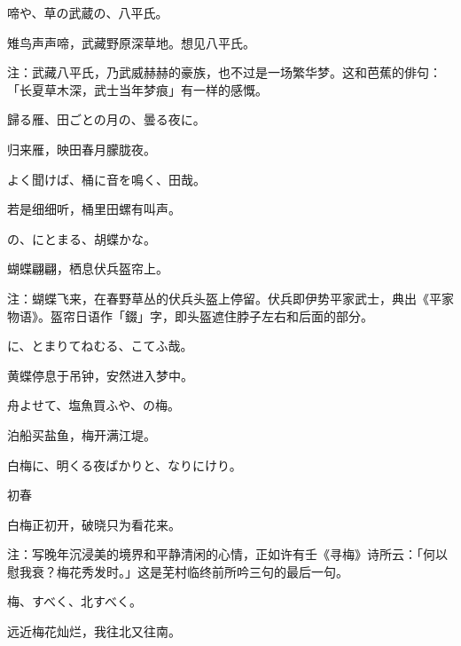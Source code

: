 \begin{haiku}
    {\FH {}啼や、草の武蔵の、八平氏。}

    {\FK 雉鸟声声啼，武藏野原深草地。想见八平氏。}

    {\FT 注：武藏八平氏，乃武威赫赫的豪族，也不过是一场繁华梦。这和芭蕉的俳句：「长夏草木深，武士当年梦痕」有一样的感慨。}
\end{haiku}

\begin{haiku}
    {\FH 歸る雁、田ごとの月の、曇る夜に。}

    {\FK 归来雁，映田春月朦胧夜。}
\end{haiku}

\begin{haiku}
    {\FH よく聞けば、桶に音を鳴く、田哉。}

    {\FK 若是细细听，桶里田螺有叫声。}
\end{haiku}

\begin{haiku}
    {\FH {}の、にとまる、胡蝶かな。}

    {\FK 蝴蝶翩翩，栖息伏兵盔帘上。}

    {\FT 注：蝴蝶飞来，在春野草丛的伏兵头盔上停留。伏兵即伊势平家武士，典出《平家物语》。盔帘日语作「錣」字，即头盔遮住脖子左右和后面的部分。}
\end{haiku}

\begin{haiku}
    {\FH {}に、とまりてねむる、こてふ哉。}

    {\FK 黄蝶停息于吊钟，安然进入梦中。}
\end{haiku}

\begin{haiku}
    {\FH 舟よせて、塩魚買ふや、の梅。}

    {\FK 泊船买盐鱼，梅开满江堤。}
\end{haiku}

\begin{haiku}
    {\FH 白梅に、明くる夜ばかりと、なりにけり。}

    {\FK 初春}

    {\FK 白梅正初开，破晓只为看花来。}

    {\FT 注：写晚年沉浸美的境界和平静清闲的心情，正如许有壬《寻梅》诗所云：「何以慰我衰？梅花秀发时。」这是芜村临终前所吟三句的最后一句。}
\end{haiku}

\begin{haiku}
    {\FH 梅、すべく、北すべく。}

    {\FK 远近梅花灿烂，我往北又往南。}
\end{haiku}


